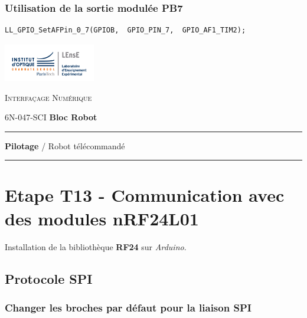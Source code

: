 \documentclass[a4paper,11pt,titlepage]{article} %
\begin{document}
\subsubsection{Utilisation de la sortie modulée PB7}
	
\begin{lstlisting}
LL_GPIO_SetAFPin_0_7(GPIOB,  GPIO_PIN_7,  GPIO_AF1_TIM2);
\end{lstlisting}

\newpage
\strut %
\begin{minipage}[c]{.25\linewidth}
	\includegraphics[width=4cm]{images/Logo-LEnsE.png}
\end{minipage} \hfill
\begin{minipage}[c]{.4\linewidth}

\begin{center}
\vspace{0.3cm}
{\Large \textsc{Interfaçage Numérique}}

\medskip

6N-047-SCI \qquad \textbf{\Large Bloc Robot}

\end{center}
\end{minipage}\hfill

\vspace{0.5cm}

\noindent \rule{\linewidth}{1pt}

{\noindent\Large \rule[-7pt]{0pt}{30pt} \textbf{Pilotage} / Robot télécommandé} 

\noindent \rule{\linewidth}{1pt}

\section{Etape T13 - Communication avec des modules nRF24L01}

Installation de la bibliothèque \textbf{RF24} sur \textit{Arduino}.

\subsection{Protocole SPI}


\subsubsection{Changer les broches par défaut pour la liaison SPI}
\end{document}

